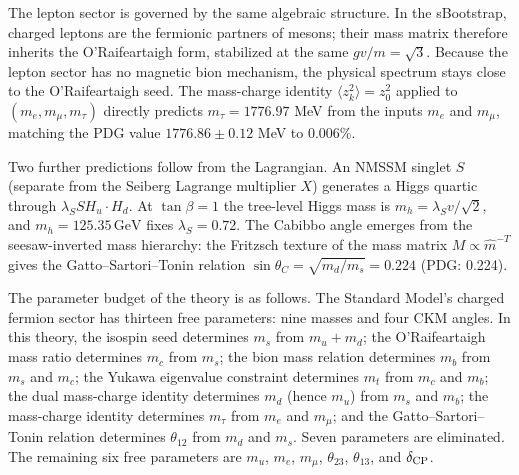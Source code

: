 \documentclass[12pt,a4paper]{article}
\newcommand{\GeV}{\,\text{GeV}}
\begin{document}
The lepton sector is governed by the same algebraic structure.
In the sBootstrap, charged leptons are the fermionic partners of
mesons; their mass matrix therefore inherits the O'Raifeartaigh
form, stabilized at the same $gv/m = \sqrt{3}$.  Because the
lepton sector has no magnetic bion mechanism, the physical spectrum
stays close to the O'Raifeartaigh seed. The mass-charge identity
$\langle z_k^2 \rangle = z_0^2$ applied to $(m_e, m_\mu, m_\tau)$
directly predicts $m_\tau = 1776.97$ MeV
from the inputs $m_e$ and $m_\mu$, matching the PDG value $1776.86 \pm
0.12$ MeV to 0.006\%.

Two further predictions follow from the Lagrangian. An NMSSM singlet $S$
(separate from the Seiberg Lagrange multiplier $X$)
generates a Higgs quartic through $\lambda_S S H_u \cdot H_d$.
At $\tan\beta = 1$ the tree-level Higgs mass is
$m_h = \lambda_S v/\sqrt{2}$, and
$m_h = 125.35\GeV$ fixes $\lambda_S = 0.72$. The Cabibbo angle
emerges from the seesaw-inverted mass hierarchy: the Fritzsch texture
of the mass matrix $M \propto \hat{m}^{-T}$ gives the
Gatto--Sartori--Tonin relation
$\sin\theta_C = \sqrt{m_d/m_s} = 0.224$ (PDG: 0.224).

The parameter budget of the theory is as follows. The Standard Model's
charged fermion sector has thirteen free parameters: nine masses and four
CKM angles. In this theory, the isospin seed determines
$m_s$ from $m_u + m_d$; the O'Raifeartaigh mass ratio determines
$m_c$ from $m_s$; the bion mass relation determines $m_b$ from $m_s$
and $m_c$; the Yukawa eigenvalue constraint determines $m_t$ from $m_c$
and $m_b$; the dual mass-charge identity determines $m_d$ (hence $m_u$) from
$m_s$ and $m_b$; the mass-charge identity determines $m_\tau$ from $m_e$
and $m_\mu$; and the Gatto--Sartori--Tonin relation determines
$\theta_{12}$ from $m_d$ and $m_s$. Seven parameters are eliminated. The
remaining six free parameters are $m_u$, $m_e$, $m_\mu$,
$\theta_{23}$, $\theta_{13}$, and $\delta_{\rm CP}$.
\end{document}
